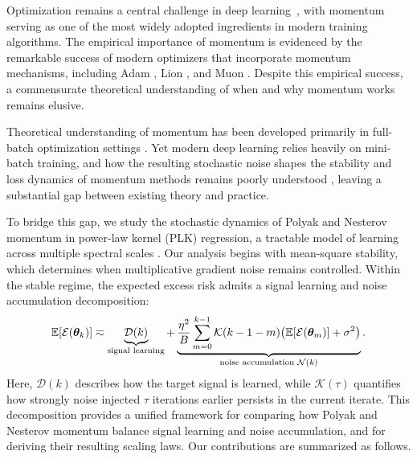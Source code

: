 \documentclass[11pt]{article}
\begin{document}
Optimization remains a central challenge in deep learning~\citep{arora2018optimizationdeepnetworksimplicit, sun2020optimization}, with momentum serving as one of the most widely adopted ingredients in modern training algorithms. The empirical importance of momentum is evidenced by the remarkable success of modern optimizers that incorporate momentum mechanisms, including Adam \citep{kingma2015adam}, Lion \citep{chen2023symbolic}, and Muon \citep{liu2025muon}.  Despite this empirical success, a commensurate theoretical understanding of when and why momentum works remains elusive.

Theoretical understanding of momentum has been developed primarily in full-batch optimization settings \citep{nesterov1983method, su2016differential, ding2025scalinglawstochasticgradient}. Yet modern deep learning relies heavily on mini-batch training, and how the resulting stochastic noise shapes the stability and loss dynamics of momentum methods remains poorly understood \citep{liu2019acceleratingsgdmomentumoverparameterized,gupta2024nesterov}, leaving a substantial gap between existing theory and practice.


To bridge this gap, we study the stochastic dynamics of Polyak and Nesterov momentum in power-law kernel (PLK) regression, a tractable model of learning across multiple spectral scales \citep{lin2024scaling,bahri2024explaining,bordelon2025feature,li2026functional}. Our analysis begins with mean-square stability, which determines when multiplicative gradient noise remains controlled. Within the stable regime, the expected excess risk admits a signal learning and noise accumulation decomposition:
\[
\mathbb{E}[\mathcal{E}(\bm{\theta}_k)]
\eqsim
\underbrace{\mathcal D(k)}_{\text{signal learning}}
+
\underbrace{
\frac{\eta^2}{B}
\sum_{m=0}^{k-1}
\mathcal K(k-1-m)
\bigl(\mathbb{E}[\mathcal{E}(\bm{\theta}_m)]+\sigma^2\bigr)
}_{\text{noise accumulation }\mathcal N(k)}.
\]
Here, \(\mathcal D(k)\) describes how the target signal is learned, while \(\mathcal K(\tau)\) quantifies how strongly noise injected \(\tau\) iterations earlier persists in the current iterate. This decomposition provides a unified framework for comparing how Polyak and Nesterov momentum balance signal learning and noise accumulation, and for deriving their resulting scaling laws. Our contributions are summarized as follows.
\end{document}
